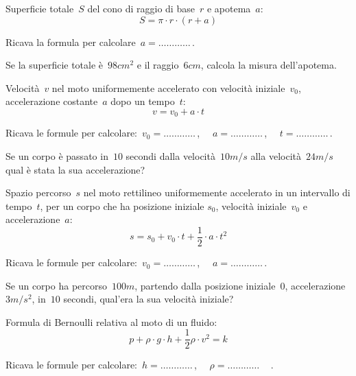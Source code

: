 \begin{esercizio}
\label{ese:20.60}
Superficie totale~\(S\) del cono di raggio di base~\(r\) e apotema~\(a\):
\begin{equation*}
  S=\pi \cdot r\cdot (r+a)
\end{equation*}

Ricava la formula per calcolare~\(a=\ldots\ldots\ldots\ldots\)\,.

Se la superficie totale è~\(98\unit{cm^2}\) e il raggio~\(6\unit{cm}\), calcola 
la misura dell'apotema.
\end{esercizio}

\begin{esercizio}
\label{ese:20.61}
Velocità~\(v\) nel moto uniformemente accelerato con velocità iniziale~\(v_0\), 
accelerazione costante~\(a\) dopo un tempo~\(t\):
\begin{equation*}
  v=v_{0}+a\cdot t
\end{equation*}

Ricava le formule per calcolare:~\(v_0=\ldots\ldots\ldots\ldots\)\,, \(\quad 
a=\ldots\ldots\ldots\ldots\)\,, \(\quad t =\ldots\ldots\ldots\ldots\)\,.

Se un corpo è passato in~\(10\) secondi dalla velocità~\(10\unit{m/s}\) alla 
velocità~\(24\unit{m/s}\) qual è stata la sua accelerazione?
\end{esercizio}

\begin{esercizio}
\label{ese:20.62}
Spazio percorso~\(s\) nel moto rettilineo uniformemente accelerato in un 
intervallo di tempo~\(t\), per un corpo che ha posizione iniziale
\(s_0\), velocità iniziale~\(v_0\) e accelerazione~\(a\):
\begin{equation*}
  s=s_{0}+v_{0}\cdot t+\dfrac{1}{2}\cdot a\cdot t^{2}
\end{equation*}

Ricava le formule per calcolare:~\(v_0=\ldots\ldots\ldots\ldots\)\,, \(\quad 
a=\ldots\ldots\ldots\ldots\)\,.

Se un corpo ha percorso~\(100\unit{m}\), partendo dalla posizione iniziale~\(0\), 
accelerazione~\(3\unit{m/s^2}\), in~\(10\) secondi, qual'era la sua velocità 
iniziale?
\end{esercizio}

\begin{esercizio}
\label{ese:20.63}
Formula di Bernoulli relativa al moto di un fluido:
\begin{equation*}
  p+\rho \cdot g\cdot h+\dfrac{1}{2}\rho \cdot v^{2}=k
\end{equation*}

Ricava le formule per calcolare:~\(h=\ldots\ldots\ldots\ldots\)\,, \(\quad 
\rho=\ldots\ldots\ldots\ldots\quad\)\,.
\end{esercizio}


